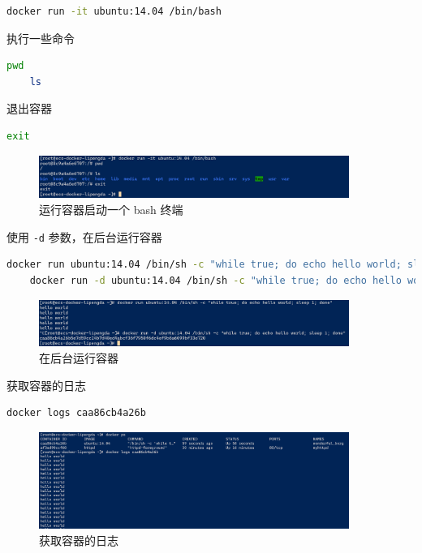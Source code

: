 \documentclass{article}
\begin{document}
\begin{lstlisting}[language=bash]
    docker run -it ubuntu:14.04 /bin/bash
\end{lstlisting}

执行一些命令

\begin{lstlisting}[language=bash]
    pwd
    ls
\end{lstlisting}

退出容器

\begin{lstlisting}[language=bash]
    exit
\end{lstlisting}

\begin{figure}[H]
\centering
\includegraphics[width=0.9\textwidth]{img/0.2.4.2.2.png}
\caption{运行容器启动一个 bash 终端}
\end{figure}

使用 \texttt{-d} 参数，在后台运行容器

\begin{lstlisting}[language=bash]
    docker run ubuntu:14.04 /bin/sh -c "while true; do echo hello world; sleep 1; done"
    docker run -d ubuntu:14.04 /bin/sh -c "while true; do echo hello world; sleep 1; done"
\end{lstlisting}

\begin{figure}[H]
\centering
\includegraphics[width=0.9\textwidth]{img/0.2.4.2.3.png}
\caption{在后台运行容器}
\end{figure}

获取容器的日志

\begin{lstlisting}[language=bash]
    docker logs caa86cb4a26b
\end{lstlisting}

\begin{figure}[H]
\centering
\includegraphics[width=0.9\textwidth]{img/0.2.4.2.4.png}
\caption{获取容器的日志}
\end{figure}
\end{document}
